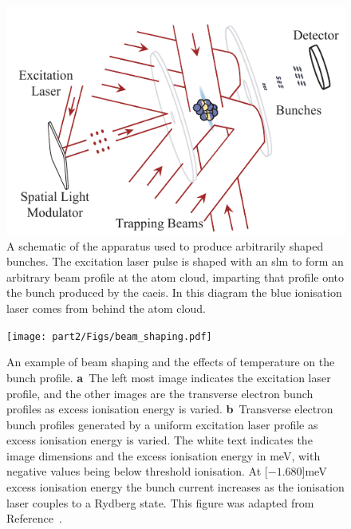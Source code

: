\begin{figure}
    \center
    \includegraphics{part2/Figs/beam_shaping_schem.pdf}
    \caption[A schematic of the apparatus used to produce arbitrarily shaped bunches.]{A schematic of the apparatus used to produce arbitrarily shaped bunches. The excitation laser pulse is shaped with an \gls{slm} to form an arbitrary beam profile at the atom cloud, imparting that profile onto the bunch produced by the \gls{caeis}. In this diagram the blue ionisation laser comes from behind the atom cloud.}
    \label{figure:beam_shaping_schematic}
\end{figure}

\begin{figure}
    \center
    \texttt{[image: part2/Figs/beam\_shaping.pdf]}
    \caption[Beam shaping and the effects of temperature.]{An example of beam shaping and the effects of temperature on the bunch profile.
    \textbf{a}~The left most image indicates the excitation laser profile, and the other images are the transverse electron bunch profiles as excess ionisation energy is varied.
    \textbf{b}~Transverse electron bunch profiles generated by a uniform excitation laser profile as excess ionisation energy is varied.
    The white text indicates the image dimensions and the excess ionisation energy in meV, with negative values being below threshold ionisation.
    At \unit[$-1.680$]{meV} excess ionisation energy the bunch current increases as the ionisation laser couples to a Rydberg state.
    This figure was adapted from Reference~\cite{mcculloch_arbitrarily_2011}.}
    \label{figure:beam_shaping}
\end{figure}

